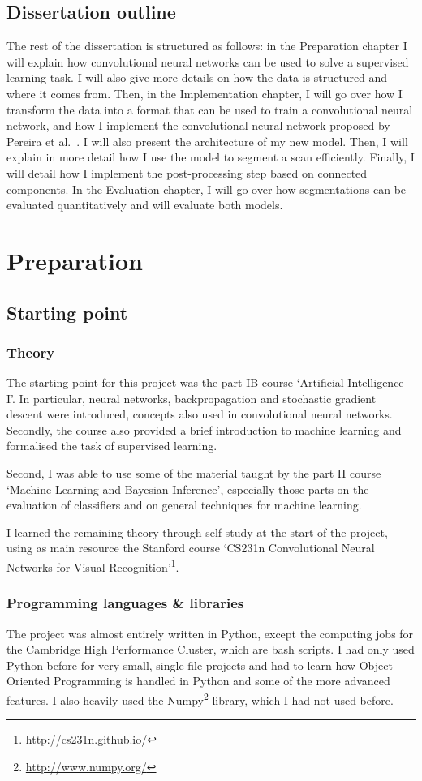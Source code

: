 \documentclass[12pt,a4paper,twoside,openright]{report}
\begin{document}
\section{Dissertation outline}
The rest of the dissertation is structured as follows: in the Preparation chapter I will explain how convolutional neural networks can be used to solve a supervised learning task. I will also give more details on how the data is structured and where it comes from. Then, in the Implementation chapter, I will go over how I transform the data into a format that can be used to train a convolutional neural network, and how I implement the convolutional neural network proposed by Pereira et al.\ \cite{pereira}. I will also present the architecture of my new model. Then, I will explain in more detail how I use the model to segment a scan efficiently. Finally, I will detail how I implement the post-processing step based on connected components. In the Evaluation chapter, I will go over how segmentations can be evaluated quantitatively and will evaluate both models.

\chapter{Preparation}

\section{Starting point}
\subsection{Theory}
The starting point for this project was the part IB course `Artificial Intelligence I'. In particular, neural networks, backpropagation and stochastic gradient descent were introduced, concepts also used in convolutional neural networks. Secondly, the course also provided a brief introduction to machine learning and formalised the task of supervised learning.

Second, I was able to use some of the material taught by the part II course `Machine Learning and Bayesian Inference', especially those parts on the evaluation of classifiers and on general techniques for machine learning.

I learned the remaining theory through self study at the start of the project, using as main resource the Stanford course `CS231n Convolutional Neural Networks for Visual Recognition'\footnote{\url{http://cs231n.github.io/}}.
\subsection{Programming languages \& libraries}
The project was almost entirely written in Python, except the computing jobs for the Cambridge High Performance Cluster, which are bash scripts. I had only used Python before for very small, single file projects and had to learn how Object Oriented Programming is handled in Python and some of the more advanced features. I also heavily used the Numpy\footnote{\url{http://www.numpy.org/}} library, which I had not used before.
\end{document}
